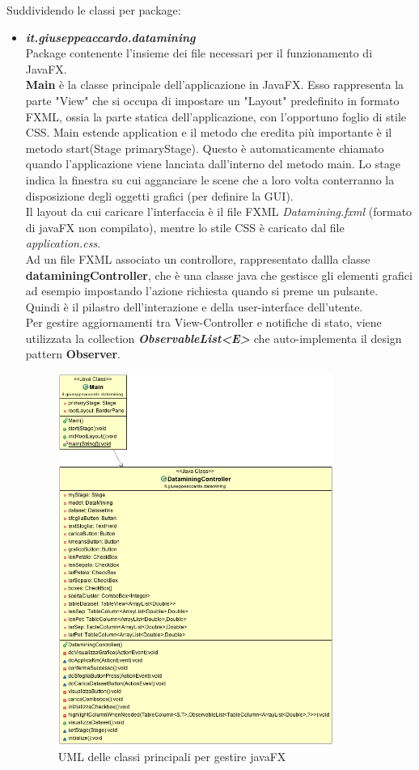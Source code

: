 \documentclass[a4paper, oneside]{book}
\begin{document}
 \newpage
Suddividendo le classi per package:
\begin{itemize}

 \item \textit{\textbf{it.giuseppeaccardo.datamining}}\\
 Package contenente l'insieme dei file necessari per il funzionamento di JavaFX.\\
 \textbf{Main} è la classe principale dell'applicazione in JavaFX. Esso rappresenta la parte "View" che si occupa di impostare un "Layout" predefinito in formato FXML, ossia la parte statica dell'applicazione, con l'opportuno foglio di stile CSS. Main estende application e il metodo che eredita più importante è il metodo start(Stage primaryStage). Questo è automaticamente chiamato quando l'applicazione viene lanciata dall'interno del metodo main. Lo stage indica la finestra su cui agganciare le scene che a loro volta conterranno la disposizione degli oggetti grafici (per definire la GUI).\\
 Il layout da cui caricare l'interfaccia è il file FXML \textit{Datamining.fxml}  (formato di javaFX non compilato), mentre lo stile CSS è caricato dal file \textit{application.css}.\\
 
Ad un file FXML  associato un controllore, rappresentato dallla classe \textbf{dataminingController}, che è una classe java che gestisce gli elementi grafici ad esempio impostando l'azione richiesta quando si preme un pulsante. Quindi è il pilastro dell'interazione e della user-interface dell'utente.\\
Per gestire aggiornamenti tra View-Controller e notifiche di stato, viene utilizzata la collection \textit{\textbf{ObservableList<E>}} che auto-implementa il design pattern \textbf{Observer}.
 \begin{figure}[htp]
\centering
\includegraphics[width=9cm]{umlDataminingFX.png}
\caption{UML delle classi principali per gestire javaFX}
\label{fig:uml javaFX}
\end{figure}




\end{itemize}
\end{document}
